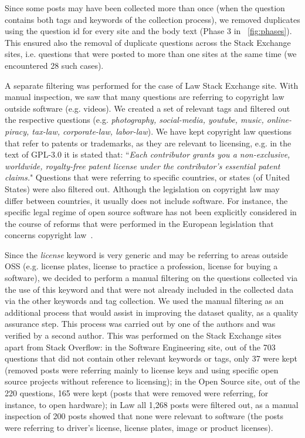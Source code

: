 \documentclass{elsarticle}
\begin{document}
Since some posts may have been collected more than once (when the question contains both tags and keywords of the collection process), we removed duplicates using the question id for every site and the body text (Phase 3 in \figurename~\ref{fig:phases}). This ensured also the removal of duplicate questions across the Stack Exchange sites, i.e. questions that were posted to more than one sites at the same time (we encountered 28 such cases). 

A separate filtering was performed for the case of Law Stack Exchange site. 
With manual inspection, we saw that many questions are referring to copyright law outside software (e.g. videos). We created a set of relevant tags and filtered out the respective questions (e.g. \emph{photography, social-media, youtube, music, online-piracy, tax-law, corporate-law, labor-law}). We have kept copyright law questions that refer to patents or trademarks, as they are relevant to licensing, e.g. in the text of GPL-3.0 it is stated that: ``\emph{Each contributor grants you a non-exclusive, worldwide, royalty-free patent license under the contributor's essential patent claims.}" Questions that were referring to specific countries, or states (of United States) were also filtered out. Although the legislation on copyright law may differ between countries, it usually does not include software. For instance, the specific legal regime of open source software has not been explicitly considered in the course of reforms that were performed in the European legislation that concerns copyright law~\cite{synodinou2016cypriot}. 

Since the \emph{license} keyword is very generic and may be referring to areas outside OSS (e.g. license plates, license to practice a profession, license for buying a software), we decided to perform a manual filtering on the questions collected via the use of this keyword and that were not already included in the collected data via the other keywords and tag collection. We used the manual filtering as an additional process that would assist in improving the dataset quality, as a quality assurance step. This process was carried out by one of the authors and was verified by a second author. This was performed on the Stack Exchange sites apart from Stack Overflow: in the Software Engineering site, out of the 703 questions that did not contain other relevant keywords or tags, only 37 were kept (removed posts were referring mainly to license keys and using specific open source projects without reference to licensing); in the Open Source site, out of the 220 questions, 165 were kept (posts that were removed were referring, for instance, to open hardware); in Law all 1,268 posts were filtered out, as a manual inspection of 200 posts showed that none were relevant to software (the posts were referring to driver's license, license plates, image or product licenses).
\end{document}
